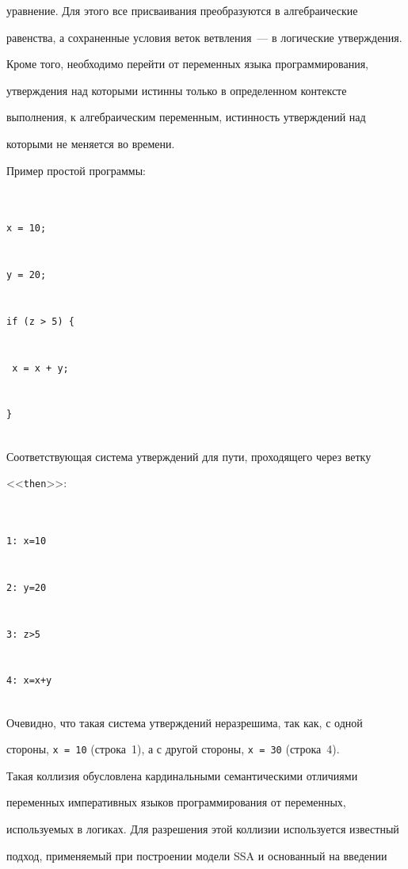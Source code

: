 уравнение. Для этого все присваивания преобразуются в алгебраические


равенства, а сохраненные условия веток ветвления~--- в логические утверждения.


Кроме того, необходимо перейти от переменных языка программирования,


утверждения над которыми истинны только в определенном контексте


выполнения, к ал\-геб\-ра\-иче\-ским переменным, истинность утверждений над


которыми не меняется во времени.





     Пример простой программы:


     \begin{verbatim}


x = 10;


y = 20;


if (z > 5) {


 x = x + y;


}


\end{verbatim}





     Соответствующая система утверждений для пути, проходящего через ветку


<<\verb"then">>:


     \begin{verbatim}


1: x=10


2: y=20


3: z>5


4: x=x+y


\end{verbatim}





     Очевидно, что такая система утверждений неразрешима, так как, с одной


стороны, \verb"x = 10" (строка~1), а с другой стороны, \verb"x = 30" (строка~4).


Такая коллизия обусловлена кардинальными семантическими отличиями


переменных императивных языков программирования от переменных,


используемых в логиках. Для разрешения этой коллизии используется известный


подход, применяемый при построении модели SSA и основанный на введении


